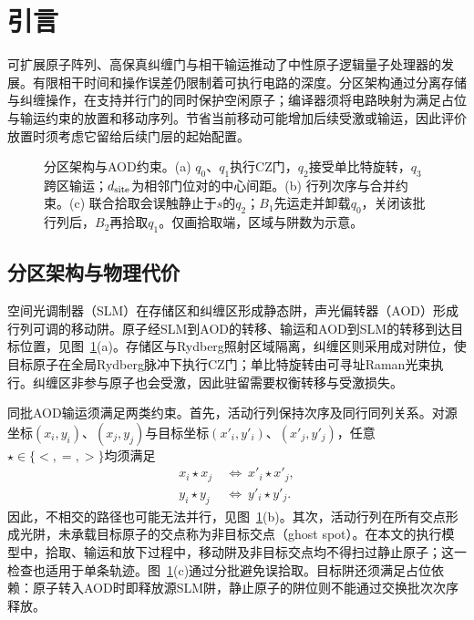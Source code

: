 \section{引言}
\label{sec:introduction}

可扩展原子阵列、高保真纠缠门与相干输运推动了中性原子逻辑量子处理器的发展\cite{bluvstein2024logicalprocessor,evered2023highfidelity,bluvstein2022coherenttransport}。有限相干时间和操作误差仍限制着可执行电路的深度\cite{preskill2018quantum}。分区架构通过分离存储与纠缠操作，在支持并行门的同时保护空闲原子\cite{stade2024abstractmodel,lin2025zac}；编译器须将电路映射为满足占位与输运约束的放置和移动序列。节省当前移动可能增加后续受激或输运，因此评价放置时须考虑它留给后续门层的起始配置。

\begin{figure}[!t]
  \centering
  \resizebox{\textwidth}{!}{}
  \caption{分区架构与AOD约束。(a) $q_0$、$q_1$执行CZ门，$q_2$接受单比特旋转，$q_3$跨区输运；$d_{\rm site}$为相邻门位对的中心间距。(b) 行列次序与合并约束。(c) 联合拾取会误触静止于$s$的$q_2$；$B_1$先运走并卸载$q_0$，关闭该批行列后，$B_2$再拾取$q_1$。仅画拾取端，区域与阱数为示意。}
  \label{fig:architecture-preliminaries}
\end{figure}

\subsection{分区架构与物理代价}
\label{sec:background}

空间光调制器（SLM）在存储区和纠缠区形成静态阱，声光偏转器（AOD）形成行列可调的移动阱。原子经SLM到AOD的转移、输运和AOD到SLM的转移到达目标位置，见图~\ref{fig:architecture-preliminaries}(a)。存储区与Rydberg照射区域隔离，纠缠区则采用成对阱位，使目标原子在全局Rydberg脉冲下执行CZ门；单比特旋转由可寻址Raman光束执行\cite{evered2023highfidelity,lin2025zac}。纠缠区非参与原子也会受激，因此驻留需要权衡转移与受激损失。

同批AOD输运须满足两类约束\cite{stade2024abstractmodel,stade2025routingaware}。首先，活动行列保持次序及同行同列关系。对源坐标$(x_i,y_i)$、$(x_j,y_j)$与目标坐标$(x'_i,y'_i)$、$(x'_j,y'_j)$，任意\mbox{$\star\in\{<,=,>\}$}均须满足
\begin{equation}
\begin{aligned}
x_i\star x_j&\ \Longleftrightarrow\ x'_i\star x'_j,\\
y_i\star y_j&\ \Longleftrightarrow\ y'_i\star y'_j.
\end{aligned}
\label{eq:aod-relations}
\end{equation}
因此，不相交的路径也可能无法并行，见图~\ref{fig:architecture-preliminaries}(b)。其次，活动行列在所有交点形成光阱，未承载目标原子的交点称为非目标交点（ghost spot）。在本文的执行模型中，拾取、输运和放下过程中，移动阱及非目标交点均不得扫过静止原子；这一检查也适用于单条轨迹。图~\ref{fig:architecture-preliminaries}(c)通过分批避免误拾取。目标阱还须满足占位依赖：原子转入AOD时即释放源SLM阱\cite{lin2025zac}，静止原子的阱位则不能通过交换批次次序释放。

